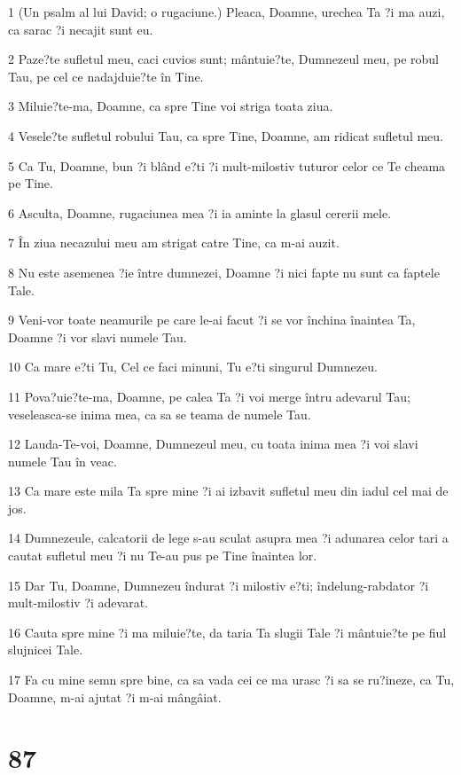 \par 1 (Un psalm al lui David; o rugaciune.) Pleaca, Doamne, urechea Ta ?i ma auzi, ca sarac ?i necajit sunt eu.
\par 2 Paze?te sufletul meu, caci cuvios sunt; mântuie?te, Dumnezeul meu, pe robul Tau, pe cel ce nadajduie?te în Tine.
\par 3 Miluie?te-ma, Doamne, ca spre Tine voi striga toata ziua.
\par 4 Vesele?te sufletul robului Tau, ca spre Tine, Doamne, am ridicat sufletul meu.
\par 5 Ca Tu, Doamne, bun ?i blând e?ti ?i mult-milostiv tuturor celor ce Te cheama pe Tine.
\par 6 Asculta, Doamne, rugaciunea mea ?i ia aminte la glasul cererii mele.
\par 7 În ziua necazului meu am strigat catre Tine, ca m-ai auzit.
\par 8 Nu este asemenea ?ie între dumnezei, Doamne ?i nici fapte nu sunt ca faptele Tale.
\par 9 Veni-vor toate neamurile pe care le-ai facut ?i se vor închina înaintea Ta, Doamne ?i vor slavi numele Tau.
\par 10 Ca mare e?ti Tu, Cel ce faci minuni, Tu e?ti singurul Dumnezeu.
\par 11 Pova?uie?te-ma, Doamne, pe calea Ta ?i voi merge întru adevarul Tau; veseleasca-se inima mea, ca sa se teama de numele Tau.
\par 12 Lauda-Te-voi, Doamne, Dumnezeul meu, cu toata inima mea ?i voi slavi numele Tau în veac.
\par 13 Ca mare este mila Ta spre mine ?i ai izbavit sufletul meu din iadul cel mai de jos.
\par 14 Dumnezeule, calcatorii de lege s-au sculat asupra mea ?i adunarea celor tari a cautat sufletul meu ?i nu Te-au pus pe Tine înaintea lor.
\par 15 Dar Tu, Doamne, Dumnezeu îndurat ?i milostiv e?ti; îndelung-rabdator ?i mult-milostiv ?i adevarat.
\par 16 Cauta spre mine ?i ma miluie?te, da taria Ta slugii Tale ?i mântuie?te pe fiul slujnicei Tale.
\par 17 Fa cu mine semn spre bine, ca sa vada cei ce ma urasc ?i sa se ru?ineze, ca Tu, Doamne, m-ai ajutat ?i m-ai mângâiat.

\chapter{87}

